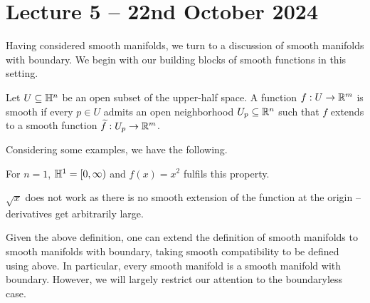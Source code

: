 \section{Lecture 5 -- 22nd October 2024}\label{sec: lecture 5}
Having considered smooth manifolds, we turn to a discussion of smooth manifolds with boundary. We begin with our building blocks of smooth functions in this setting. 
\begin{definition}\label{def: smooth functions on upper half space}
    Let $U\subseteq\mathbb{H}^{n}$ be an open subset of the upper-half space. A function $f:U\to\mathbb{R}^{m}$ is smooth if every $p\in U$ admits an open neighborhood $U_{p}\subseteq\mathbb{R}^{n}$ such that $f$ extends to a smooth function $\widetilde{f}:U_{p}\to\mathbb{R}^{m}$. 
\end{definition}
Considering some examples, we have the following. 
\begin{example}
    For $n=1$, $\mathbb{H}^{1}=[0,\infty)$ and $f(x)=x^{2}$ fulfils this property. 
\end{example}
\begin{example}
    $\sqrt{x}$ does not work as there is no smooth extension of the function at the origin -- derivatives get arbitrarily large. 
\end{example}
Given the above definition, one can extend the definition of smooth manifolds to smooth manifolds with boundary, taking smooth compatibility to be defined using  above. In particular, every smooth manifold is a smooth manifold with boundary. However, we will largely restrict our attention to the boundaryless case. 


